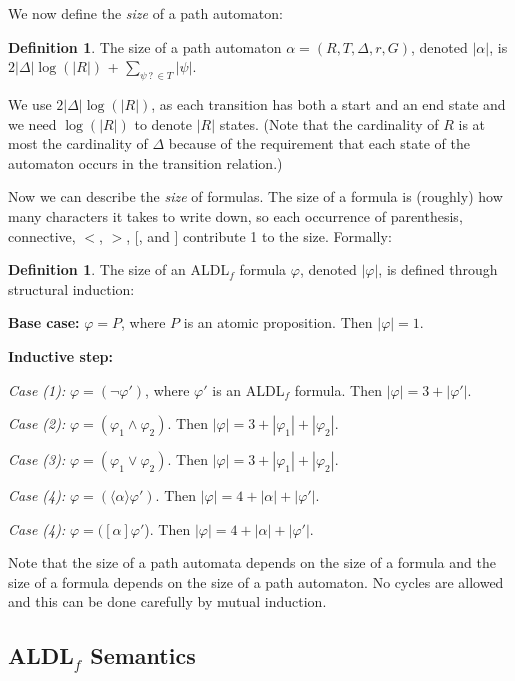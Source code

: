 \documentclass[10pt,a4paper]{amsart}
\theoremstyle{plain}
\theoremstyle{definition}
\newtheorem{definition}[thm]{Definition}
\theoremstyle{definition}
\newcommand{\dbox}[1]{\langle #1 \rangle}
\newcommand{\bbox}[1]{[ #1 ]}
\DeclareMathOperator{\?}{?}
\begin{document}
We now define the \emph{size} of a path automaton:
\begin{definition}
The size of a path automaton $\alpha =(R, T, \Delta, r, G)$, denoted $|\alpha|$, is $2|\Delta|\log(|R|)$ + $\sum\limits_{\psi\? \in T}^{} |\psi|$.
\end{definition}

We use $2|\Delta|\log (|R|)$,  as each transition has both a start and an end state and we need $\log(|R|)$ to denote $|R|$ states. (Note that the cardinality of $R$ is at most the cardinality of $\Delta$ because of the requirement that each state of the automaton occurs in the transition relation.)


Now we can describe the \emph{size} of formulas. The size of a formula is (roughly) how many characters it takes to write down, so each occurrence of parenthesis, connective, $<$, $>$, [, and ] contribute 1 to the size. Formally: 
\begin{definition}
  The size of an ALDL$_f$ formula $\varphi$, denoted $|\varphi|$, is defined through structural induction:

  \textbf{Base case:} $\varphi = P$, where $P$ is an atomic proposition. Then $|\varphi| = 1$.

  \textbf{Inductive step:}

  \textit{Case (1):} $\varphi = (\neg\varphi')$, where $\varphi'$ is an ALDL$_f$ formula. Then $|\varphi| = 3 + |\varphi'|$.

  \textit{Case (2):} $\varphi = (\varphi_1 \wedge \varphi_2)$. Then $|\varphi| = 3 + |\varphi_1| + |\varphi_2|$.

  \textit{Case (3):} $\varphi = (\varphi_1 \vee \varphi_2)$. Then $|\varphi| = 3 + |\varphi_1| + |\varphi_2|$.


  \textit{Case (4):} $\varphi = (\dbox{\alpha}\varphi')$. Then $|\varphi| = 4 + |\alpha| + |\varphi'|$.

  \textit{Case (4):} $\varphi = (\bbox{\alpha}\varphi'$). Then $|\varphi| = 4 + |\alpha| + |\varphi'|$.

  \end{definition}

  Note that the size of a path automata depends on the size of a formula and the size of a formula depends on the size of a path automaton. No cycles are allowed and this can be done carefully by mutual induction.


\subsection{\texorpdfstring{ALDL$_f$ Semantics}{ALDLf Semantics}}
\end{document}
